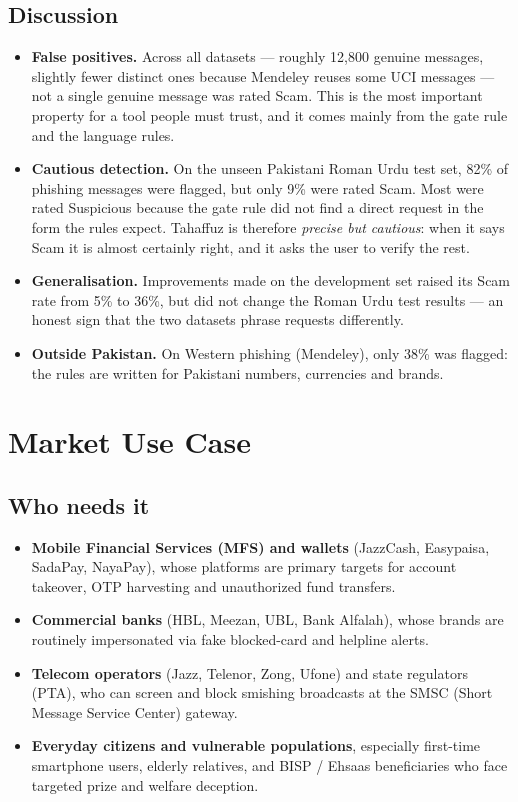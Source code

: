 \documentclass[11pt,a4paper]{article}
\begin{document}
\subsection{Discussion}
\begin{itemize}
  \item \textbf{False positives.} Across all datasets --- roughly 12{,}800 genuine messages, slightly
        fewer distinct ones because Mendeley reuses some UCI messages --- not a single genuine message
        was rated Scam. This is the most important property for a tool people
        must trust, and it comes mainly from the gate rule and the language rules.
  \item \textbf{Cautious detection.} On the unseen Pakistani Roman Urdu test set, 82\% of phishing
        messages were flagged, but only 9\% were rated Scam. Most were rated Suspicious because the
        gate rule did not find a direct request in the form the rules expect. Tahaffuz is therefore
        \emph{precise but cautious}: when it says Scam it is almost certainly right, and it asks the
        user to verify the rest.
  \item \textbf{Generalisation.} Improvements made on the development set raised its Scam rate from
        5\% to 36\%, but did not change the Roman Urdu test results --- an honest sign that the two
        datasets phrase requests differently.
  \item \textbf{Outside Pakistan.} On Western phishing (Mendeley), only 38\% was flagged: the rules are
        written for Pakistani numbers, currencies and brands.
\end{itemize}

\section{Market Use Case}

\subsection{Who needs it}
\begin{itemize}
  \item \textbf{Mobile Financial Services (MFS) and wallets} (JazzCash, Easypaisa, SadaPay, NayaPay), whose
        platforms are primary targets for account takeover, OTP harvesting and unauthorized fund transfers.
  \item \textbf{Commercial banks} (HBL, Meezan, UBL, Bank Alfalah), whose brands are routinely impersonated
        via fake blocked-card and helpline alerts.
  \item \textbf{Telecom operators} (Jazz, Telenor, Zong, Ufone) and state regulators (PTA), who can screen
        and block smishing broadcasts at the SMSC (Short Message Service Center) gateway.
  \item \textbf{Everyday citizens and vulnerable populations}, especially first-time smartphone users,
        elderly relatives, and BISP / Ehsaas beneficiaries who face targeted prize and welfare deception.
\end{itemize}
\end{document}
